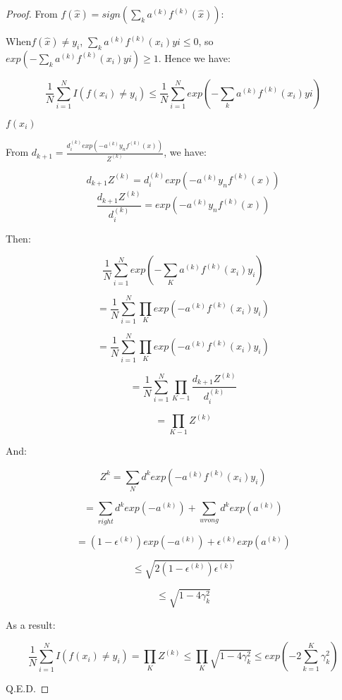 \documentclass{article} %
\newtheorem{proof}{Proof}
\begin{document}
\begin{proof}


    From $f(\hat{x})=sign(\sum_k a^{(k)}f^{(k)}(\hat{x}))$:

    When$f(\hat{x})\neq y_i$, $\sum_ka^{(k)}f^{(k)}(x_i)yi\leq 0$, so $exp(-\sum_ka^{(k)}f^{(k)}(x_i)yi)\geq 1$. Hence we have:
    
    $$\frac{1}{N}\sum_{i=1}^{N}I(f(x_i)\neq y_i)\leq \frac{1}{N}\sum_{i=1}^{N}exp(-\sum_ka^{(k)}f^{(k)}(x_i)yi)$$
    
    $f(x_i)$
    
    From $d_{k+1}=\frac{d_i^{(k)}exp(-a^{(k)}y_nf^{(k)}(x))}{Z^{(k)}}$, we have:
    
    $$d_{k+1}Z^{(k)}=d_i^{(k)}exp(-a^{(k)}y_nf^{(k)}(x))$$
    $$\frac{d_{k+1}Z^{(k)}}{d_i^{(k)}}=exp(-a^{(k)}y_nf^{(k)}(x))$$
    
    Then:
    
    $$\frac{1}{N}\sum_{i=1}^{N}exp(-\sum_Ka^{(k)}f^{(k)}(x_i)y_i)$$
    
    $$=\frac{1}{N}\sum_{i=1}^{N}\prod_K exp(-a^{(k)}f^{(k)}(x_i)y_i)$$
    
    $$=\frac{1}{N}\sum_{i=1}^{N}\prod_K exp(-a^{(k)}f^{(k)}(x_i)y_i)$$
    
    $$=\frac{1}{N}\sum_{i=1}^{N}\prod_{K-1} \frac{d_{k+1}Z^{(k)}}{d_i^{(k)}}$$
    
    $$=\prod_{K-1} Z^{(k)}$$
    
    And:
    
    $$Z^{k}=\sum_Nd^kexp(-a^{(k)}f^{(k)}(x_i)y_i)$$
    
    $$=\sum_{right}d^kexp(-a^{(k)})+\sum_{wrong}d^kexp(a^{(k)})$$
    
    $$=(1-\epsilon^{(k)})exp(-a^{(k)})+\epsilon^{(k)}exp(a^{(k)})$$
    
    $$\leq \sqrt{2(1-\epsilon^{(k)})\epsilon^{(k)}}$$
    
    $$\leq \sqrt{1-4\gamma_k^2}$$
    
    As a result:
    
    $$\frac{1}{N}\sum_{i=1}^{N}I(f(x_i)\neq y_i)=\prod_{K} Z^{(k)}\leq \prod_K \sqrt{1-4\gamma_k^2} \leq exp(-2\sum_{k=1}^{K}\gamma_k^2)$$
    
    Q.E.D.

\end{proof}
\end{document}
